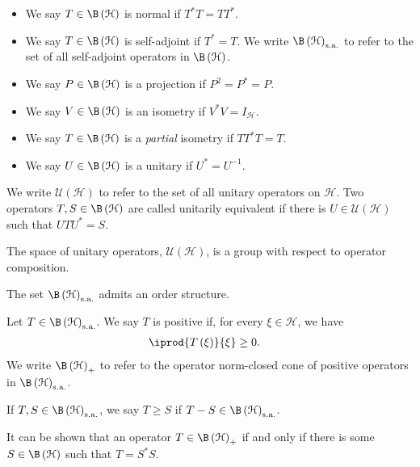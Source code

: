\begin{definition}\hfill
  \begin{itemize}
    \item We say $T\in \B\left(\mathcal{H}\right)$ is normal if $T^{\ast}T = TT^{\ast}$.
    \item We say $T\in \B\left(\mathcal{H}\right)$ is self-adjoint if $T^{\ast}= T$. We write $\B\left(\mathcal{H}\right)_{\sa}$ to refer to the set of all self-adjoint operators in $\B\left(\mathcal{H}\right)$.
    \item We say $P\in \B\left(\mathcal{H}\right)$ is a projection if $P^2 = P^{\ast} = P$.
    \item We say $V\in \B\left(\mathcal{H}\right)$ is an isometry if $V^{\ast}V = I_{\mathcal{H}}$.
    \item We say $T\in \B\left(\mathcal{H}\right)$ is a \textit{partial} isometry if $TT^{\ast}T = T$.
    \item We say $U\in \B\left(\mathcal{H}\right)$ is a unitary if $U^{\ast} = U^{-1}$.
  \end{itemize}
  We write $\mathcal{U}\left(\mathcal{H}\right)$ to refer to the set of all unitary operators on $\mathcal{H}$. Two operators $T,S\in \B\left(\mathcal{H}\right)$ are called unitarily equivalent if there is $U\in \mathcal{U}\left(\mathcal{H}\right)$ such that $UTU^{\ast} = S$.\newline

  The space of unitary operators, $\mathcal{U}\left(\mathcal{H}\right)$, is a group with respect to operator composition.
\end{definition}
The set $\B\left(\mathcal{H}\right)_{\sa}$ admits an order structure.
\begin{definition}
  Let $T\in \B\left(\mathcal{H}\right)_{\sa}$. We say $T$ is positive if, for every $\xi\in \mathcal{H}$, we have
  \begin{align*}
    \iprod{T\left(\xi\right)}{\xi} &\geq 0.
  \end{align*}
  We write $\B\left(\mathcal{H}\right)_{+}$ to refer to the operator norm-closed cone of positive operators in $\B\left(\mathcal{H}\right)_{\sa}$.\newline

  If $T,S\in \B\left(\mathcal{H}\right)_{\sa}$, we say $T\geq S$ if $T-S \in \B\left(\mathcal{H}\right)_{\sa}$.
\end{definition}
\begin{remark}
  It can be shown that an operator $T\in \B\left(\mathcal{H}\right)_{+}$ if and only if there is some $S\in \B\left(\mathcal{H}\right)$ such that $T = S^{\ast}S$.
\end{remark}
